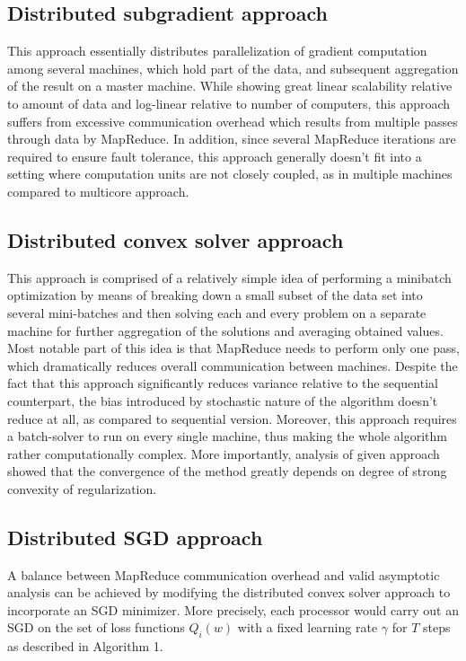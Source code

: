 \subsection{Distributed subgradient approach}
This approach essentially distributes parallelization of gradient computation among several machines, which hold part of the data, and subsequent aggregation of the result on a master machine. While showing great linear scalability relative to amount of data and log-linear relative to number of computers, this approach suffers from excessive communication overhead which results from multiple passes through data by MapReduce. In addition, since several MapReduce iterations are required to ensure fault tolerance, this approach generally doesn't fit into a setting where computation units are not closely coupled, as in multiple machines compared to multicore approach.

\subsection{Distributed convex solver approach}
This approach is comprised of a relatively simple idea of performing a minibatch optimization by means of breaking down a small subset of the data set into several mini-batches and then solving each and every problem on a separate machine for further aggregation of the solutions and averaging obtained values. Most notable part of this idea is that MapReduce needs to perform only one pass, which dramatically reduces overall communication between machines. Despite the fact that this approach significantly reduces variance relative to the sequential counterpart, the bias introduced by stochastic nature of the algorithm doesn't reduce at all, as compared to sequential version. Moreover, this approach requires a batch-solver to run on every single machine, thus making the whole algorithm rather computationally complex. More importantly, analysis of given approach showed that the convergence of the method greatly depends on degree of strong convexity of regularization. 

\subsection{Distributed SGD approach}
A balance between MapReduce communication overhead and valid asymptotic analysis can be achieved by modifying the distributed convex solver approach to incorporate an SGD minimizer. More precisely, each processor would carry out an SGD on the set of loss functions $Q_i(w)$ with a fixed learning rate $\gamma$ for $T$ steps as described in Algorithm 1.

